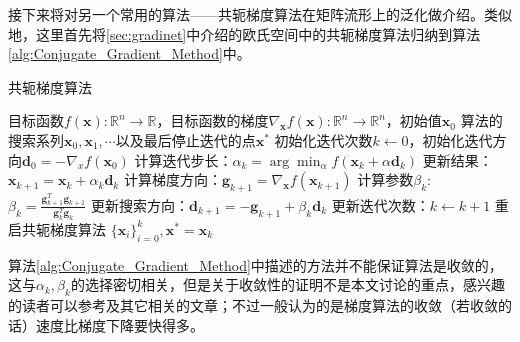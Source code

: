 接下来将对另一个常用的算法——共轭梯度算法在矩阵流形上的泛化做介绍。类似地，这里首先将\ref{sec:gradinet}中介绍的欧氏空间中的共轭梯度算法归纳到算法\ref{alg:Conjugate_Gradient_Method}中。
\begin{algorithm}[htb]
\caption{共轭梯度算法}
\label{alg:Conjugate_Gradient_Method}
\begin{algorithmic}[1]
\REQUIRE 目标函数$f(\bm{x}):\mathbb{R}^{n}\rightarrow \mathbb{R}$，目标函数的梯度$\nabla_{\bm{x}} f(\bm{x}):\mathbb{R}^{n}\rightarrow \mathbb{R}^{n}$，初始值$\bm{x}_0$
\ENSURE 算法的搜索系列$\bm{x}_0,\bm{x}_1,\cdots$以及最后停止迭代的点$\bm{x}^{*}$
\STATE 初始化迭代次数$k\leftarrow 0$，初始化迭代方向$\bm{d}_{0}=-\nabla_x f(\bm{x}_0)$
\STATE 计算迭代步长：$\alpha_{k}=\arg\min_{\alpha}f(\bm{x}_{k}+\alpha\bm{d}_{k})$
\STATE 更新结果：$\bm{x}_{k+1}=\bm{x}_{k}+\alpha_{k}\bm{d}_{k}$
\STATE 计算梯度方向：$\bm{g}_{k+1}=\nabla_{\bm{x}}f(\bm{x}_{k+1})$
\STATE 计算参数$\beta_{k}$: $\beta_{k}=\frac{\bm{g}_{k+1}^{T}\bm{g}_{k+1}}{\bm{g}_{k}^{T}\bm{g}_{k}}$
\STATE 更新搜索方向：$\bm{d}_{k+1}=-\bm{g}_{k+1}+\beta_{k}\bm{d}_{k}$
\STATE 更新迭代次数：$k\leftarrow k+1$
\STATE 重启共轭梯度算法
\ENDIF
\ENDWHILE
\RETURN $\{\bm{x}_i\}_{i=0}^{k},\bm{x}^{*}=\bm{x}_{k}$
\end{algorithmic}
\end{algorithm}

算法\ref{alg:Conjugate_Gradient_Method}中描述的方法并不能保证算法是收敛的，这与$\alpha_{k},\beta_{k}$的选择密切相关，但是关于收敛性的证明不是本文讨论的重点，感兴趣的读者可以参考\cite{Maniopt_book}及其它相关的文章；不过一般认为的是梯度算法的收敛（若收敛的话）速度比梯度下降要快得多。

